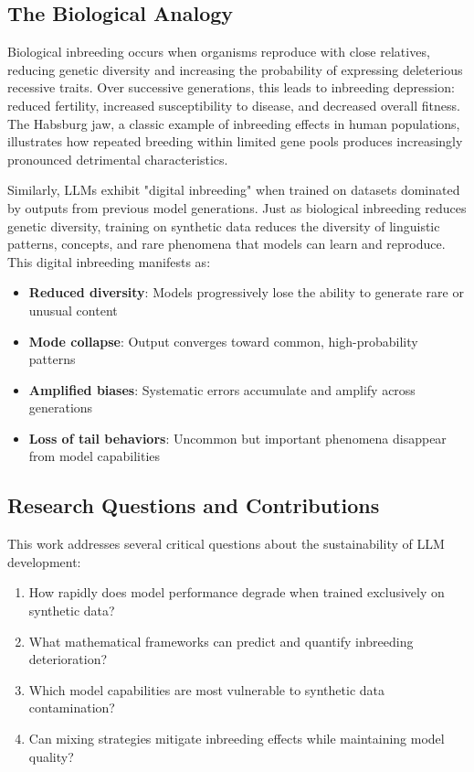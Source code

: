 \documentclass{article}
\begin{document}
\subsection{The Biological Analogy}

Biological inbreeding occurs when organisms reproduce with close relatives, reducing genetic diversity and increasing the probability of expressing deleterious recessive traits. Over successive generations, this leads to inbreeding depression: reduced fertility, increased susceptibility to disease, and decreased overall fitness. The Habsburg jaw, a classic example of inbreeding effects in human populations, illustrates how repeated breeding within limited gene pools produces increasingly pronounced detrimental characteristics.

Similarly, LLMs exhibit "digital inbreeding" when trained on datasets dominated by outputs from previous model generations. Just as biological inbreeding reduces genetic diversity, training on synthetic data reduces the diversity of linguistic patterns, concepts, and rare phenomena that models can learn and reproduce. This digital inbreeding manifests as:

\begin{itemize}
\item \textbf{Reduced diversity}: Models progressively lose the ability to generate rare or unusual content
\item \textbf{Mode collapse}: Output converges toward common, high-probability patterns
\item \textbf{Amplified biases}: Systematic errors accumulate and amplify across generations
\item \textbf{Loss of tail behaviors}: Uncommon but important phenomena disappear from model capabilities
\end{itemize}

\subsection{Research Questions and Contributions}

This work addresses several critical questions about the sustainability of LLM development:

\begin{enumerate}
\item How rapidly does model performance degrade when trained exclusively on synthetic data?
\item What mathematical frameworks can predict and quantify inbreeding deterioration?
\item Which model capabilities are most vulnerable to synthetic data contamination?
\item Can mixing strategies mitigate inbreeding effects while maintaining model quality?
\end{enumerate}
\end{document}
